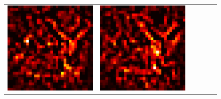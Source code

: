 \documentclass[preprint,12pt]{elsarticle}
\begin{document}
\begin{figure}[p]
\begin{tabular}{cccccc}
  \includegraphics[scale=\scale]{../visualizations/examples/cifar10/resnet18/positive_saliency_map/4.png} & 
  \includegraphics[scale=\scale]{../visualizations/examples/cifar10/resnet18/negative_saliency_map/4.png} & 

\end{tabular}
\end{figure}
\end{document}

